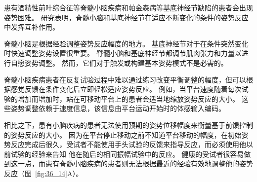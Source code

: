 患有酒精性前叶综合征等脊髓小脑疾病和帕金森病等基底神经节缺陷的患者会出现姿势困难。
研究表明，脊髓小脑和基底神经节在适应不断变化的条件的姿势反应中发挥互补作用。


脊髓小脑是根据经验调整姿势反应幅度的地方。
基底神经节对于在条件突然变化时快速调整姿势设置很重要。
脊髓小脑和基底神经节都调节肌肉张力和力量以进行自愿姿势调整。
然而，它们对于触发或构建基本姿势模式不是必需的。


脊髓小脑疾病患者在反复试验过程中难以通过练习改变平衡调整的幅度，但可以根据感觉反馈在条件变化后立即轻松适应姿势反应。
例如，当平台速度随着每次试验的增加而增加时，站在可移动平台上的患者会适当地缩放姿势反应的大小。
这些姿势调整依赖于速度信息，该信息由平台运动开始时的体感输入编码。


相比之下，患有小脑疾病的患者无法使用预期的姿势位移幅度来衡量基于前馈控制的姿势反应的大小。
因为在平台停止移动之前不知道平台移动的幅度，在初始姿势反应完成后很久，受试者不能使用手头试验的反馈来指导反应，而必须使用他以前试验的经验来告知 他在随后的相同振幅试验中的反应。
健康的受试者很容易做到这一点，而患有脊髓小脑疾病的患者则无法根据最近的经验有效地调整他的姿势反应（图~\ref{fig:36_14}A）。


